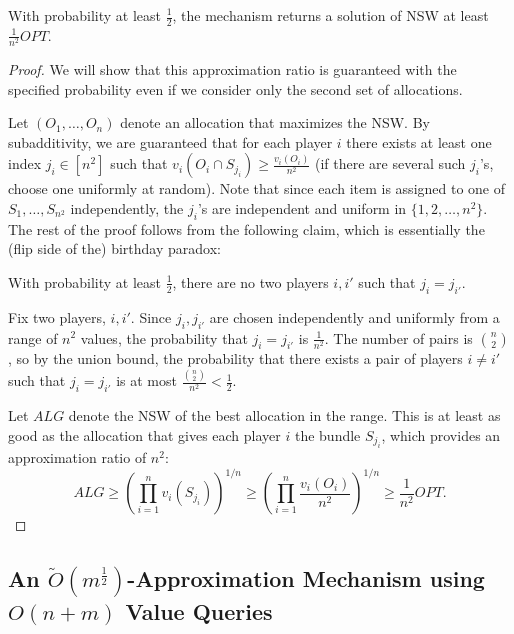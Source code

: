 \documentclass{theoretics}
\begin{document}
\begin{lemma}
With probability at least $\frac12$, the mechanism returns a solution of NSW at least $\frac{1}{n^2} OPT$.
\end{lemma}
\begin{proof}
We will show that this approximation ratio is guaranteed with the specified probability even if we consider only the second set of allocations.

Let $(O_1,\ldots, O_n)$ denote an allocation that maximizes the NSW. By subadditivity, we are guaranteed that for each player $i$ there exists at least one index $j_i \in [n^2]$ such that $v_i(O_i \cap S_{j_i})\geq \frac {v_i(O_i)} {n^2}$ (if there are several such $j_i$'s, choose one uniformly at random). Note that since each item is assigned to one of $S_1,\ldots, S_{n^2}$ independently, the $j_i$'s are independent and uniform in $\{1,2,\ldots, n^2\}$. The rest of the proof follows from the following claim, which is essentially the (flip side of the) birthday paradox:
\begin{claim*}
With probability at least $\frac 1 {2}$, there are no two players $i,i'$ such that $j_i=j_{i'}$.
\end{claim*}
\begin{subproof}
Fix two players, $i,i'$. Since $j_i, j_{i'}$ are chosen independently and uniformly from a range of $n^2$ values, the probability that $j_i=j_{i'}$ is $\frac 1 {n^2}$. The number of pairs is $\binom{n}{2}$, so by the union bound, the probability that there exists a pair of players $i \neq i'$ such that $j_i=j_{i'}$ is at most $\frac {\binom{n}{2}} {n^2} < \frac 1 2$.
\end{subproof}

Let $ALG$ denote the NSW of the best allocation in the range. This is at least as good as the allocation that gives each player $i$ the bundle $S_{j_i}$, which provides an approximation ratio of $n^2$:
$$
ALG \geq \left( \prod_{i=1}^{n}  v_i(S_{j_i}) \right)^{1/n} \geq \left( \prod_{i=1}^{n}  \frac {v_i(O_i)}{n^2}  \right)^{1/n}  \geq \frac{1}{n^2} OPT.
$$
\end{proof}



\subsection{An \texorpdfstring{$\tilde O(m^{\frac12})$}{\~O(m\^{}(1/2))}-Approximation Mechanism using \texorpdfstring{$O(n+m)$}{O(n+m)} Value Queries}\label{subsec-approx-m12}
\end{document}
